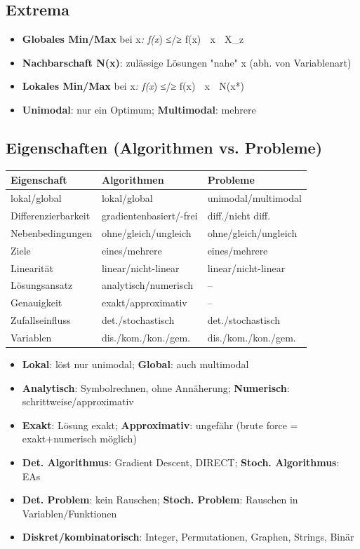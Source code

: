 \documentclass[11pt, a4paper]{article}
\begin{document}
\subsection{Extrema}

\begin{itemize}
  \item \textbf{Globales Min/Max} bei x⃗\textit{: f(x⃗}) ≤/≥ f(x⃗) ∀ x⃗ ∈ X\_z
  \item \textbf{Nachbarschaft N(x⃗)}: zulässige Lösungen "nahe" x⃗ (abh. von Variablenart)
  \item \textbf{Lokales Min/Max} bei x⃗\textit{: f(x⃗}) ≤/≥ f(x⃗) ∀ x⃗ ∈ N(x⃗*)
  \item \textbf{Unimodal}: nur ein Optimum; \textbf{Multimodal}: mehrere
\end{itemize}


\subsection{Eigenschaften (Algorithmen vs. Probleme)}


{\small
\begin{tabularx}{\linewidth}{XXX}
\hline
\rowcolor{tableheadbg}
{\color{white}\textbf{Eigenschaft}} & {\color{white}\textbf{Algorithmen}} & {\color{white}\textbf{Probleme}} \\[2pt]
\hline
\endhead
\hline
\endfoot
lokal/global & lokal/global & unimodal/multimodal \\
Differenzierbarkeit & gradientenbasiert/-frei & diff./nicht diff. \\
Nebenbedingungen & ohne/gleich/ungleich & ohne/gleich/ungleich \\
Ziele & eines/mehrere & eines/mehrere \\
Linearität & linear/nicht-linear & linear/nicht-linear \\
Lösungsansatz & analytisch/numerisch & – \\
Genauigkeit & exakt/approximativ & – \\
Zufallseinfluss & det./stochastisch & det./stochastisch \\
Variablen & dis./kom./kon./gem. & dis./kom./kon./gem. \\
\end{tabularx}
}


\begin{itemize}
  \item \textbf{Lokal}: löst nur unimodal; \textbf{Global}: auch multimodal
  \item \textbf{Analytisch}: Symbolrechnen, ohne Annäherung; \textbf{Numerisch}: schrittweise/approximativ
  \item \textbf{Exakt}: Lösung exakt; \textbf{Approximativ}: ungefähr (brute force = exakt+numerisch möglich)
  \item \textbf{Det. Algorithmus}: Gradient Descent, DIRECT; \textbf{Stoch. Algorithmus}: EAs
  \item \textbf{Det. Problem}: kein Rauschen; \textbf{Stoch. Problem}: Rauschen in Variablen/Funktionen
  \item \textbf{Diskret/kombinatorisch}: Integer, Permutationen, Graphen, Strings, Binär
\end{itemize}
\end{document}
